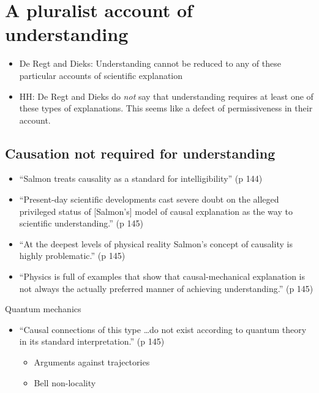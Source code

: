 \documentclass[fleqn]{beamer}
\begin{document}
\section{A pluralist account of understanding}

\begin{frame}

  \begin{itemize}
  \item De Regt and Dieks: Understanding cannot be reduced to any of
    these particular accounts of scientific explanation
  \item HH: De Regt and Dieks do \emph{not} say that understanding
    requires at least one of these types of explanations. This seems
    like a defect of permissiveness in their account.
  \end{itemize}

\end{frame}

\subsection{Causation not required for understanding}

\begin{frame}

  \begin{itemize}
  \item ``Salmon treats causality as a standard for intelligibility'' (p 144)
  \item ``Present-day scientific developments cast severe doubt on the
    alleged privileged status of [Salmon's] model of causal explanation
    as the way to scientific understanding.'' (p 145)
  \item ``At the deepest levels of physical reality Salmon's concept of
    causality is highly problematic.'' (p 145)
  \item ``Physics is full of examples that show that causal-mechanical
    explanation is not always the actually preferred manner of achieving
    understanding.'' (p 145)
  \end{itemize}

\end{frame}

\begin{frame}{Quantum mechanics}

  \begin{itemize}
  \item ``Causal connections of this type \dots do not exist according
    to quantum theory in its standard interpretation.'' (p 145)
    \begin{itemize}
    \item Arguments against trajectories
    \item Bell non-locality
    \end{itemize}
  \end{itemize}

\end{frame}
\end{document}

